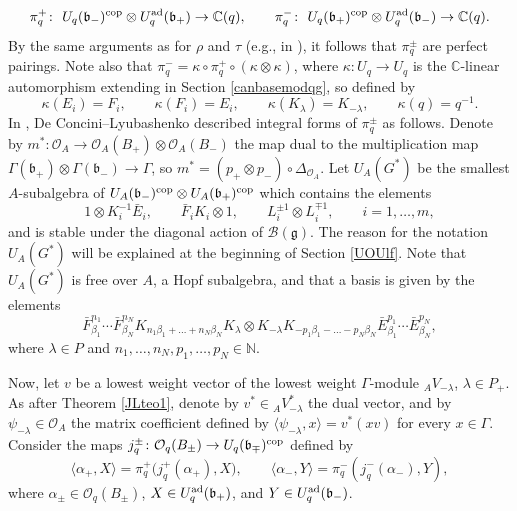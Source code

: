 \documentclass[10pt,a4paper]{amsart}
\numberwithin{equation}{section}
\theoremstyle{definition}
\newcommand{\mc}{\mathbb{C}}
\newcommand{\Oo}{{\mathcal O}}
\newcommand{\ra}{\rightarrow}
\begin{document}
\[\pi^{+}_q\colon\ U_q(\mathfrak{b}_-)^{\rm cop}\otimes U_q^{\rm ad}(\mathfrak{b}_+)\ra \mc(q),\qquad \pi^-_q\colon\ U_q(\mathfrak{b}_+)^{\rm cop}\otimes U_q^{\rm ad}(\mathfrak{b}_-)\ra \mc(q).\]
By the same arguments as for $\rho$ and $\tau$ (e.g., in \cite[Proposition 3.92]{VY}), it follows that $\pi^{\pm}_q$ are perfect pairings. Note also that $\pi^-_q =\kappa \circ \pi^+_q\circ (\kappa\otimes \kappa)$, where $\kappa\colon U_q \ra U_q$ is the $\mc$-linear automorphism extending \smash{${}^-\colon U_q^{\rm ad} \ra U_q^{\rm ad}$} in Section \ref{canbasemodqg}, so defined by
\begin{equation}\label{kappadef}
\kappa(E_i) = F_i,\qquad\kappa(F_i) = E_i,\qquad \kappa(K_\lambda) = K_{-\lambda},\qquad \kappa(q) = q^{-1}.
\end{equation}
In \cite{DC-L}, De Concini--Lyubashenko described integral forms of $\pi_q^\pm$ as follows. Denote by $m^*\colon \Oo_A\ra \Oo_A(B_+)\otimes \Oo_A(B_-)$ the map dual to the multiplication map $\Gamma(\mathfrak{b}_+)\otimes \Gamma(\mathfrak{b}_-)\ra \Gamma$, so $m^* = (p_+ \otimes p_-)\circ \Delta_{\Oo_A}$. Let $U_A(G^*)$ be the smallest $A$-subalgebra of $U_A(\mathfrak{b}_-)^{\rm cop}\otimes U_A(\mathfrak{b}_+)^{\rm cop}$ which contains the elements
\[1\otimes K_i^{-1}\bar{E}_i,\qquad \bar{F}_iK_i\otimes 1,\qquad L_i^{\pm 1}\otimes L_i^{\mp 1}, \qquad i=1,\dots,m,\]
and is stable under the diagonal action of $\mathcal{B}(\mathfrak{g})$. The reason for the notation $U_A(G^*)$ will be explained at the beginning of Section \ref{UOUlf}. Note that $U_A(G^*)$ is free over $A$, a Hopf subalgebra, and that a basis is given by the elements
\begin{equation}\label{basiselmt}
\bar{F}_{\beta_1}^{n_1}\cdots \bar{F}_{\beta_N}^{n_N}K_{n_1\beta_1+\dots+ n_N \beta_N}K_{\lambda}
\otimes K_{-\lambda}K_{-p_1\beta_1-\dots- p_N \beta_N}\bar{E}_{\beta_1}^{p_1}\cdots \bar{E}_{\beta_N}^{p_N},
\end{equation}
where $\lambda\in P$ and $n_1,\dots ,n_N, p_1,\dots ,p_N \in {\mathbb N}$.

Now, let $v$ be a lowest weight vector of the lowest weight $\Gamma$-module ${}_AV_{-\lambda}$, $\lambda \in P_+$. As after Theorem \ref{JLteo1}, denote by $v^*\in {}_AV_{-\lambda}^*$ the dual vector, and by $\psi_{-\lambda}\in \Oo_A$ the matrix coefficient defined by $\langle \psi_{-\lambda},x\rangle = v^*(xv)$ for every $x\in \Gamma$. Consider the maps $j_q^\pm\colon \Oo_q(B_\pm) \ra U_q(\mathfrak{b}_\mp)^{\rm cop}$ defined by
\[
\langle \alpha_+,X\rangle = \pi_q^+\big(j_q^+(\alpha_+),X\big),\qquad \langle \alpha_-,Y\rangle = \pi_q^-(j_q^-(\alpha_-),Y),
\]
where $\alpha_\pm\in \Oo_q(B_\pm)$, $X\in U_q^{\rm ad}(\mathfrak{b}_+)$, and $Y\in U_q^{\rm ad}(\mathfrak{b}_-)$.
\end{document}
